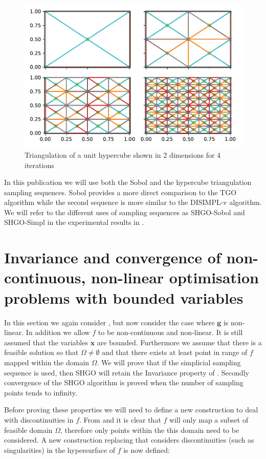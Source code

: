 \begin{figure}
\centerline{\includegraphics[scale=1.0]{./Fig10.pdf}}
{\caption{Triangulation of a unit hypercube shown in 2 dimensions for 4 iterations  \label{fig:triangles} }}
\end{figure}

In this publication we will use both the Sobol and the hypercube triangulation sampling sequences. Sobol provides a more direct comparison to the TGO algorithm while the second sequence is more similar to the DISIMPL-v algorithm. We will refer to the different uses of sampling sequences as SHGO-Sobol and SHGO-Simpl in the experimental results in .

\section{Invariance and convergence of non-continuous, non-linear optimisation problems with bounded variables}
In this section we again consider , but now consider the case where $\mathbf{g}$ is non-linear. In addition we allow $f$ to be non-continuous and non-linear. It is still assumed that the variables $\mathbf{x}$ are bounded. Furthermore we assume that there is a feasible solution so that $\Omega \neq \emptyset$ and that there exists at least point in range of $f$ mapped within the domain $\Omega$. We will prove that if the simplicial sampling sequence \citep{SHGOpy} is used, then SHGO will retain the Invariance property of . Secondly convergence of the SHGO algorithm is proved when the number of sampling points tends to infinity.

Before proving these properties we will need to define a new construction to deal with discontinuities in $f$. From  and  it is clear that $f$ will only map a subset of feasible domain $\Omega$, therefore only points within the this domain need to be considered. A new construction replacing  that considers discontinuities (such as singularities) in the hypersurface of $f$ is now defined:

